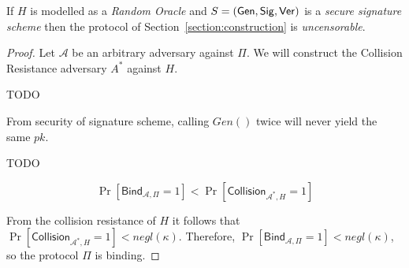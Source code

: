 \begin{theorem}
  If $H$ is modelled as a \emph{Random Oracle} and $S = (\mathsf{Gen}, \mathsf{Sig}, \mathsf{Ver})$ is a \emph{secure signature scheme} then the protocol of Section~\ref{section:construction} is \emph{uncensorable}.
\end{theorem}
\begin{proof}
  Let $\mathcal{A}$ be an arbitrary adversary against $\Pi$.
  We will construct the Collision Resistance adversary $A^*$ against $H$.

  TODO

  From security of signature scheme, calling $Gen()$ twice will never yield the same $pk$.

  TODO

  \[
    \Pr[\textsf{Bind}_{\mathcal{A},\Pi} = 1]
    <
    \Pr[\textsf{Collision}_{\mathcal{A}^*,H} = 1]
  \]

  From the collision resistance of $H$ it follows that $\Pr[\textsf{Collision}_{\mathcal{A}^*,H} = 1] < negl(\kappa)$. Therefore,
  $\Pr[\textsf{Bind}_{\mathcal{A},\Pi} = 1] < negl(\kappa)$, so
  the protocol $\Pi$ is binding.
\end{proof}
